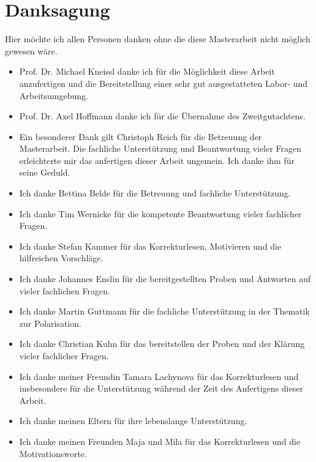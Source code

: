 \thispagestyle{fancy}
\justifying
\chapter*{Danksagung}

Hier möchte ich allen Personen danken ohne die diese Masterarbeit nicht möglich gewesen wäre.
\begin{itemize}
	\item Prof. Dr. Michael Kneissl danke ich für die Möglichkeit diese Arbeit anzufertigen und die Bereitstellung einer sehr gut ausgestatteten Labor- und Arbeitsumgebung.
	\item Prof. Dr. Axel Hoffmann danke ich für die Übernahme des Zweitgutachtens.
	\item Ein besonderer Dank gilt Christoph Reich für die Betreuung der Masterarbeit. Die fachliche Unterstützung und Beantwortung vieler Fragen erleichterte mir das anfertigen dieser Arbeit ungemein. Ich danke ihm für seine Geduld. 
	\item Ich danke Bettina Belde für die Betreuung und fachliche Unterstützung.
	\item Ich danke Tim Wernicke für die kompetente Beantwortung vieler fachlicher Fragen.
	\item Ich danke Stefan Kammer für das Korrekturlesen, Motivieren und die hilfreichen Vorschläge.
	\item Ich danke Johannes Enslin für die bereitgestellten Proben und Antworten auf vieler fachlichen Fragen.
	\item Ich danke Martin Guttmann für die fachliche Unterstützung in der Thematik zur Polarisation.	
	\item Ich danke Christian Kuhn für das bereitstellen der Proben und der Klärung vieler fachlicher Fragen.
	\item Ich danke meiner Freundin Tamara Lachynova für das Korrekturlesen und insbesondere für die Unterstützung während der Zeit des Anfertigens dieser Arbeit.
	\item Ich danke meinen Eltern für ihre lebenslange Unterstützung.
	\item Ich danke meinen Freunden Maja und Mila für das Korrekturlesen und die Motivationsworte. 
	
\end{itemize}